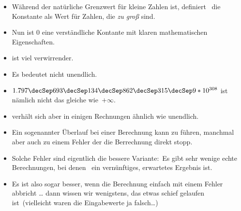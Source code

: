 \documentclass[aspectratio=169,mathserif,notheorems]{beamer}%
\begin{document}
\begin{frame}[t]
\begin{itemize}
{}%
%
%
%
\item<39-> Während  der natürliche Grenzwert für kleine Zahlen ist, definiert \python\ die Konstante  als Wert für Zahlen, die \emph{zu groß} sind.%
%
\item<40-> Nun ist 0 eine verständliche Kontante mit klaren mathematischen Eigenschaften.%
%
\item<41->  ist viel verwirrender.%
%
\item<42-> Es bedeutet \alert{nicht} unendlich.%
%
\item<43-> $1.797\decSep693\decSep134\decSep862\decSep315\decSep9*10^{308}$ ist nämlich nicht das gleiche wie~$+\infty$.%
%
\item<44->  verhält sich aber in einigen Rechnungen ähnlich wie unendlich.%
%
\item<45-> Ein sogenannter Überlauf bei einer Berechnung kann zu  führen, manchmal aber auch zu einem Fehler der die Berrechnung direkt stopp.%
%
\item<46-> Solche Fehler sind eigentlich die bessere Variante:~Es gibt sehr wenige echte Berechnungen, bei denen~ ein vernünftiges, erwartetes Ergebnis ist.%
%
\item<47-> Es ist also sogar besser, wenn die Berechnung einfach mit einem Fehler abbricht {\dots} dann wissen wir wenigstens, das etwas schief gelaufen ist~(vielleicht waren die Eingabewerte ja falsch\dots)%
%
\end{itemize}%
%
%
%
%
%
%
%
%
%

\end{frame}
\end{document}
